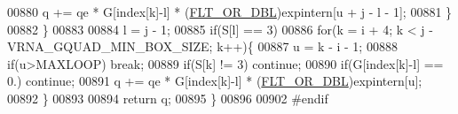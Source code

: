 \begin{DoxyCode}
00880       q += qe * G[index[k]-l] * (\hyperlink{group__data__structures_ga31125aeace516926bf7f251f759b6126}{FLT\_OR\_DBL})expintern[u + j - l - 1];
00881     \}
00882   \}
00883 
00884   l = j - 1;
00885   \textcolor{keywordflow}{if}(S[l] == 3)
00886     \textcolor{keywordflow}{for}(k = i + 4; k < j - VRNA\_GQUAD\_MIN\_BOX\_SIZE; k++)\{
00887       u    = k - i - 1;
00888       \textcolor{keywordflow}{if}(u>MAXLOOP) \textcolor{keywordflow}{break};
00889       \textcolor{keywordflow}{if}(S[k] != 3) \textcolor{keywordflow}{continue};
00890       \textcolor{keywordflow}{if}(G[index[k]-l] == 0.) \textcolor{keywordflow}{continue};
00891       q += qe * G[index[k]-l] * (\hyperlink{group__data__structures_ga31125aeace516926bf7f251f759b6126}{FLT\_OR\_DBL})expintern[u];
00892     \}
00893 
00894   \textcolor{keywordflow}{return} q;
00895 \}
00896 
00902 \textcolor{preprocessor}{#endif}
\end{DoxyCode}
